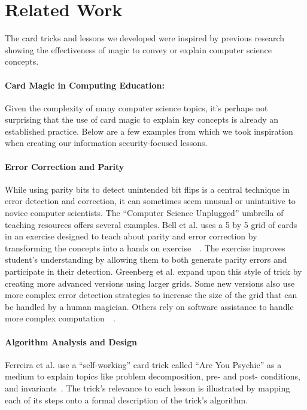 \section{Related Work}
\label{SEC:related-work}

The card tricks and lessons we developed were inspired by previous research
showing the effectiveness of magic to convey or explain computer science
concepts.

\paragraph{Card Magic in Computing Education:}
Given the complexity of many computer science topics, it's perhaps not
surprising that the use of card magic to explain key concepts is already an
established practice.  Below are a few examples from which we took inspiration
when creating our information security-focused lessons.

\paragraph{Error Correction and Parity}
While using parity bits to detect unintended bit flips is a central technique
in error detection and correction, it can sometimes seem unusual or unintuitive
to novice computer scientists.
The ``Computer Science Unplugged'' umbrella of teaching resources offers
several examples.  Bell et al. uses
a 5 by 5 grid of cards in an exercise designed to teach about parity and
error correction by transforming the concepts into a hands on
exercise~\cite{bell2009computer}~\cite{csunplugged}.  The exercise improves
student's understanding by allowing them to both generate parity errors and
participate in their detection.
Greenberg et al. expand upon this style of trick by creating more advanced
versions using larger grids.  Some new versions also use
more complex error detection
strategies to increase the size of the grid that can be handled by a human
magician.  Others rely on software assistance to handle more complex
computation~\cite{Greenberg2017}~\cite{Greenberg2018}.

\paragraph{Algorithm Analysis and Design}
Ferreira et al. use a ``self-working'' card trick called ``Are You Psychic''
as a medium to explain topics
like problem decomposition, pre- and post- conditions, and
invariants~\cite{ferreira2014magic}.
The trick's relevance to each lesson is illustrated by
mapping each of its steps
onto a formal description of the trick's algorithm.

